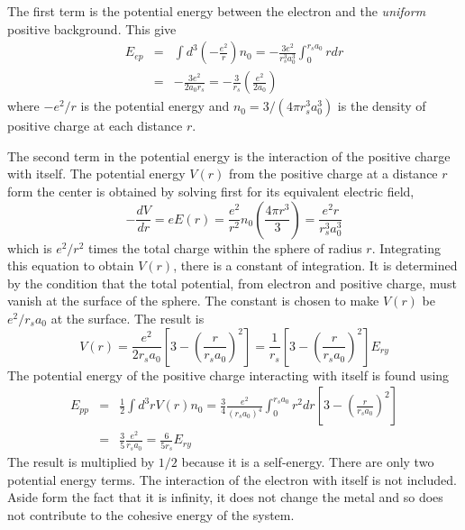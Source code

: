 The first term is the potential energy between the electron and the \textit{uniform} positive background. This give
\begin{eqnarray}
    E_{ep} &=& \int d^3 \left(- \frac{e^2}{r} \right) n_0 = - \frac{3 e^2}{r_s^3 a_0^3} \int_0^{r_s a_0} r dr \nonumber \\
    &=& - \frac{3e^2}{2 a_0 r_s} = - \frac{3}{r_s} \left( \frac{e^2}{2 a_0} \right)  \label{5.75}
\end{eqnarray}
where $-e^2/r$ is the potential energy and $n_0= 3/(4\pi r_s^3 a_0^3)$ is the density of positive charge at each distance $r$.

The second term in the potential energy is the interaction of the positive charge with itself.
The potential energy $V(r)$ from the positive charge at a distance $r$ form the center is obtained by solving first for its equivalent electric field,
\begin{equation}
    - \frac{dV}{dr} =  eE(r) = \frac{e^2}{r^2} n_0 \left( \frac{4 \pi r^3}{3} \right) = \frac{e^2 r}{r_s^3 a_0^3} \label{5.76}
\end{equation}
which is $e^2/r^2$ times the total charge within the sphere of radius $r$.
Integrating this equation to obtain $V(r)$, there is a constant of integration.
It is determined by the condition that the total potential, from electron and positive charge, must vanish at the surface of the sphere.
The constant is chosen to make $V(r)$ be $e^2/r_s a_0$ at the surface.
The result is
\begin{equation}
    V(r) = \frac{e^2}{2 r_s a_0 } \left[ 3 - \left( \frac{r}{r_s a_0} \right)^2  \right] = \frac{1}{r_s} \left[ 3 - \left( \frac{r}{r_s a_0} \right)^2 \right] E_{ry}   \label{5.77}
\end{equation}
The potential energy of the positive charge interacting with itself is found using
\begin{eqnarray}
    E_{pp} &=& \frac{1}{2} \int d^3 r V(r) n_0 = \frac{3}{4}  \frac{e^2}{(r_s a_0)^4} \int_0^{r_s a_0} r^2 dr \left[3 - \left( \frac{r}{r_s a_0} \right)^2 \right] \nonumber \\
    &=& \frac{3}{5} \frac{e^2}{r_s a_0} = \frac{6}{5 r_s}  E_{ry} \label{5.78}
\end{eqnarray}
The result is multiplied by $1/2$ because it is a self-energy.
There are only two potential energy terms.
The interaction of the electron with itself is not included.
Aside form the fact that it is infinity, it does not change the metal and so does not contribute to the cohesive energy of the system.


